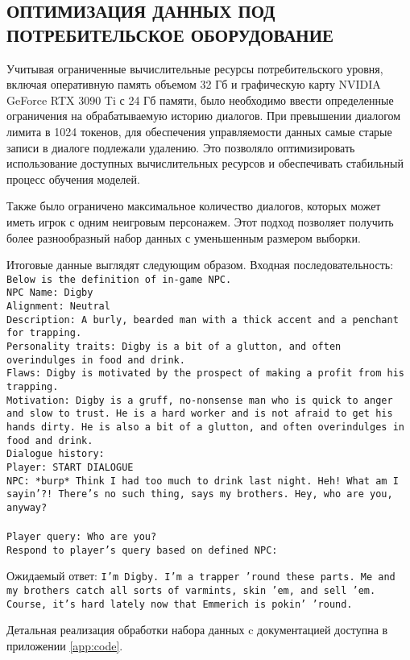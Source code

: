 \subsection{ОПТИМИЗАЦИЯ ДАННЫХ ПОД ПОТРЕБИТЕЛЬСКОЕ ОБОРУДОВАНИЕ}

Учитывая ограниченные вычислительные ресурсы потребительского уровня, включая оперативную память объемом 32 Гб и графическую карту NVIDIA GeForce RTX 3090 Ti с 24 Гб памяти, было необходимо ввести определенные ограничения на обрабатываемую историю диалогов. При превышении диалогом лимита в 1024 токенов, для обеспечения управляемости данных самые старые записи в диалоге подлежали удалению. Это позволяло оптимизировать использование доступных вычислительных ресурсов и обеспечивать стабильный процесс обучения моделей. 

Также было ограничено максимальное количество диалогов, которых может иметь игрок с одним неигровым персонажем. Этот подход позволяет получить более разнообразный набор данных с уменьшенным размером выборки.

Итоговые данные выглядят следующим образом.
Входная последовательность:
\texttt{\\Below is the definition of in-game NPC.\\
      NPC Name: Digby\\
      Alignment: Neutral\\
      Description: A burly, bearded man with a thick accent and a penchant for trapping.\\
      Personality traits: Digby is a bit of a glutton, and often overindulges in food and drink.\\
      Flaws: Digby is motivated by the prospect of making a profit from his trapping.\\
      Motivation: Digby is a gruff, no-nonsense man who is quick to anger and slow to trust. He is a hard worker and is not afraid to get his hands dirty. He is also a bit of a glutton, and often overindulges in food and drink.\\
      Dialogue history:\\
      Player: START DIALOGUE\\
      NPC: *burp* Think I had too much to drink last night. Heh! What am I sayin'?! There's no such thing, says my brothers. Hey, who are you, anyway?\\\\
      Player query: Who are you?\\
      Respond to player's query based on defined NPC:\\}

Ожидаемый ответ: \texttt{I'm Digby. I'm a trapper 'round these parts. Me and my brothers catch all sorts of varmints, skin 'em, and sell 'em. Course, it's hard lately now that Emmerich is pokin' 'round.}

Детальная реализация обработки набора данных c документацией доступна в приложении \ref{app:code}.